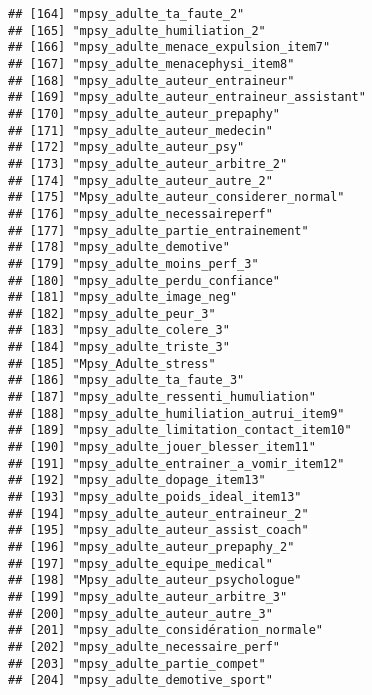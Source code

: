 \documentclass[
]{article}
\begin{document}
\begin{verbatim}
## [164] "mpsy_adulte_ta_faute_2"                              
## [165] "mpsy_adulte_humiliation_2"                           
## [166] "mpsy_adulte_menace_expulsion_item7"                  
## [167] "mpsy_adulte_menacephysi_item8"                       
## [168] "mpsy_adulte_auteur_entraineur"                       
## [169] "mpsy_adulte_auteur_entraineur_assistant"             
## [170] "mpsy_adulte_auteur_prepaphy"                         
## [171] "mpsy_adulte_auteur_medecin"                          
## [172] "mpsy_adulte_auteur_psy"                              
## [173] "mpsy_adulte_auteur_arbitre_2"                        
## [174] "mpsy_adulte_auteur_autre_2"                          
## [175] "Mpsy_adulte_auteur_considerer_normal"                
## [176] "mpsy_adulte_necessaireperf"                          
## [177] "mpsy_adulte_partie_entrainement"                     
## [178] "mpsy_adulte_demotive"                                
## [179] "mpsy_adulte_moins_perf_3"                            
## [180] "mpsy_adulte_perdu_confiance"                         
## [181] "mpsy_adulte_image_neg"                               
## [182] "mpsy_adulte_peur_3"                                  
## [183] "mpsy_adulte_colere_3"                                
## [184] "mpsy_adulte_triste_3"                                
## [185] "Mpsy_Adulte_stress"                                  
## [186] "mpsy_adulte_ta_faute_3"                              
## [187] "mpsy_adulte_ressenti_humuliation"                    
## [188] "mpsy_adulte_humiliation_autrui_item9"                
## [189] "mpsy_adulte_limitation_contact_item10"               
## [190] "mpsy_adulte_jouer_blesser_item11"                    
## [191] "mpsy_adulte_entrainer_a_vomir_item12"                
## [192] "mpsy_adulte_dopage_item13"                           
## [193] "mpsy_adulte_poids_ideal_item13"                      
## [194] "mpsy_adulte_auteur_entraineur_2"                     
## [195] "mpsy_adulte_auteur_assist_coach"                     
## [196] "mpsy_adulte_auteur_prepaphy_2"                       
## [197] "mpsy_adulte_equipe_medical"                          
## [198] "Mpsy_adulte_auteur_psychologue"                      
## [199] "mpsy_adulte_auteur_arbitre_3"                        
## [200] "mpsy_adulte_auteur_autre_3"                          
## [201] "mpsy_adulte_considération_normale"                   
## [202] "mpsy_adulte_necessaire_perf"                         
## [203] "mpsy_adulte_partie_compet"                           
## [204] "mpsy_adulte_demotive_sport"                          

\end{verbatim}
\end{document}
